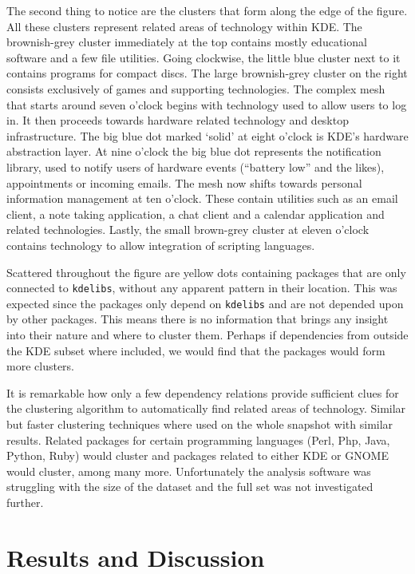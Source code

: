 \documentclass[smallextended,final]{svjour3}
\begin{document}
The second thing to notice are the clusters that form along the edge of the figure. All these clusters represent related areas of technology within KDE. The brownish-grey cluster immediately at the top contains mostly educational software and a few file utilities. Going clockwise, the little blue cluster next to it contains programs for compact discs. The large brownish-grey cluster on the right consists exclusively of games and supporting technologies. The complex mesh that starts around seven o'clock begins with technology used to allow users to log in. It then proceeds towards hardware related technology and desktop infrastructure. The big blue dot marked `solid' at eight o'clock is KDE's hardware abstraction layer. At nine o'clock the big blue dot represents the notification library, used to notify users of hardware events (``battery low'' and the likes), appointments or incoming emails. The mesh now shifts towards personal information management at ten o'clock. These contain utilities such as an email client, a note taking application, a chat client and a calendar application and related technologies. Lastly, the small brown-grey cluster at eleven o'clock contains technology to allow integration of scripting languages.

Scattered throughout the figure are yellow dots containing packages that are only connected to \verb|kdelibs|, without any apparent pattern in their location. This was expected since the packages only depend on \verb|kdelibs| and are not depended upon by other packages. This means there is no information that brings any insight into their nature and where to cluster them. Perhaps if dependencies from outside the KDE subset where included, we would find that the packages would form more clusters.

It is remarkable how only a few dependency relations provide sufficient clues for the clustering algorithm to automatically find related areas of technology. Similar but faster clustering techniques where used on the whole snapshot with similar results. Related packages for certain programming languages (Perl, Php, Java, Python, Ruby) would cluster and packages related to either KDE or GNOME would cluster, among many more. Unfortunately the analysis software was struggling with the size of the dataset and the full set was not investigated further.

\section{Results and Discussion}
\end{document}
